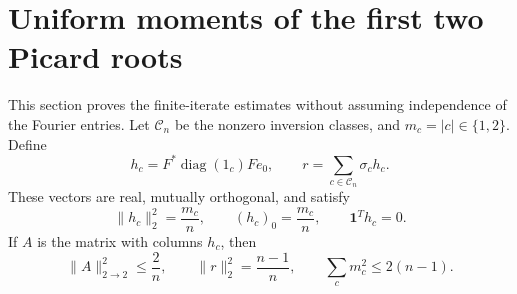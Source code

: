 \documentclass[11pt]{article}
\theoremstyle{remark}\newtheorem{remark}[theorem]{Remark}
\newcommand{\one}{\mathbf 1}
\newcommand{\sgn}{\sigma}
\begin{document}
\section{Uniform moments of the first two Picard roots}
This section proves the finite-iterate estimates without assuming independence
of the Fourier entries. Let $\mathcal C_n$ be the nonzero inversion classes,
and $m_c=|c|\in\{1,2\}$. Define
\[
 h_c=F^*\operatorname{diag}(1_c)Fe_0,
 \qquad r=\sum_{c\in\mathcal C_n}\sgn_c h_c.
\]
These vectors are real, mutually orthogonal, and satisfy
\begin{equation}\label{eq:hc}
 \|h_c\|_2^2=\frac{m_c}{n},\qquad
 (h_c)_0=\frac{m_c}{n},\qquad \one^Th_c=0.
\end{equation}
If $A$ is the matrix with columns $h_c$, then
\begin{equation}\label{eq:Ac}
 \|A\|_{2\to2}^2\le\frac2n,\qquad
 \|r\|_2^2=\frac{n-1}{n},\qquad
 \sum_c m_c^2\le2(n-1).
\end{equation}
\end{document}
